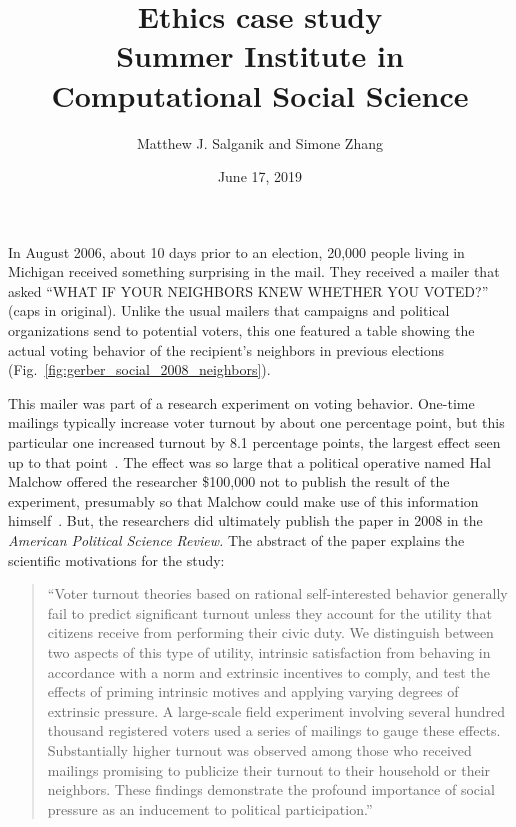 \documentclass{article}
\title{Ethics case study\\Summer Institute in Computational Social Science\footnotemark[1]}
\author{Matthew J. Salganik and Simone Zhang}
\date{June 17, 2019}
\begin{document}
\maketitle
\renewcommand{\thefootnote}{\fnsymbol{footnote}}
\thispagestyle{empty}
\renewcommand{\thefootnote}{\arabic{footnote}}

In August 2006, about 10 days prior to an election, 20,000 people living in Michigan received something surprising in the mail.  They received a mailer that asked ``WHAT IF YOUR NEIGHBORS KNEW WHETHER YOU VOTED?'' (caps in original). Unlike the usual mailers that campaigns and political organizations send to potential voters, this one featured a table showing the actual voting behavior of the recipient's neighbors in previous elections (Fig.~\ref{fig:gerber_social_2008_neighbors}). 

This mailer was part of a research experiment on voting behavior.  One-time mailings typically increase voter turnout by about one percentage point, but this particular one increased turnout by 8.1 percentage points, the largest effect seen up to that point~\citep{gerber_social_2008}.  The effect was so large that a political operative named Hal Malchow offered the researcher \$100,000 not to publish the result of the experiment, presumably so that Malchow could make use of this information himself~\citep[p. 304]{issenberg_victory_2012}.  But, the researchers did ultimately publish the paper in 2008 in the \textit{American Political Science Review.} The abstract of the paper explains the scientific motivations for the study:

\begin{quote}
``Voter turnout theories based on rational self-interested behavior generally fail to predict significant turnout unless they account for the utility that citizens receive from performing their civic duty. We distinguish between two aspects of this type of utility, intrinsic satisfaction from behaving in accordance with a norm and extrinsic incentives to comply, and test the effects of priming intrinsic motives and applying varying degrees of extrinsic pressure. A large-scale field experiment involving several hundred thousand registered voters used a series of mailings to gauge these effects. Substantially higher turnout was observed among those who received mailings promising to publicize their turnout to their household or their neighbors. These findings demonstrate the profound importance of social pressure as an inducement to political participation.''
\end{quote}
 
\end{document}
